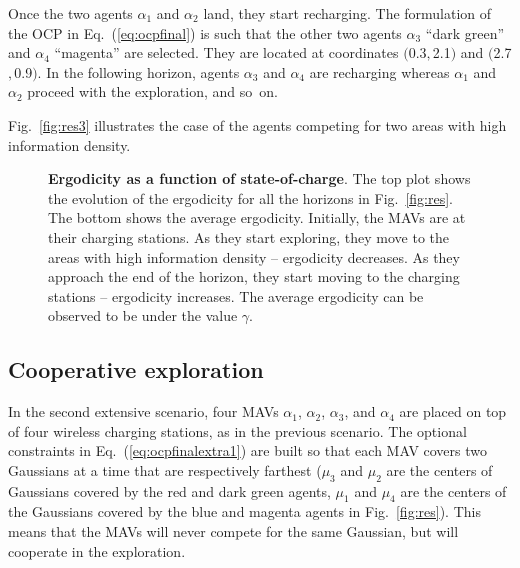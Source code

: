 \documentclass[letterpaper,10pt,conference,twoside]{IEEEtran}
\theoremstyle{definition}
\begin{document}
Once the two agents $\alpha_1$ and $\alpha_2$ land, they start recharging. The formulation of the OCP in Eq.~(\ref{eq:ocpfinal}) is such that the other two agents $\alpha_3$ ``dark green'' and $\alpha_4$ ``magenta'' are selected. They are located at coordinates $($0.3$,$2.1$)$ and $($2.7$,$0.9$)$. %
%
In the following horizon, agents $\alpha_3$ and $\alpha_4$ are recharging whereas $\alpha_1$ and $\alpha_2$ proceed with the exploration, %
and so~on.

Fig.~\ref{fig:res3} illustrates the case of the agents competing for two areas with high information density.

\begin{figure}[t!]
  \begin{minipage}[t!]{.5\columnwidth}
    \vspace*{-.2cm}
    
  \end{minipage}
  \begin{minipage}[c]{.48\columnwidth}
    \vspace*{.05cm}
    \caption{\textbf{Ergodicity %
    as a function of state-of-charge}. The top plot shows the evolution of the ergodicity for all the horizons in Fig.~\ref{fig:res}. The bottom shows the average ergodicity. Initially, the MAVs are at their charging stations. As they start exploring, they move to the areas with high information density -- ergodicity decreases. As they approach the end of the horizon, they start moving to the charging stations -- ergodicity increases. The average ergodicity can be observed to be under the value $\gamma$.}
    \label{fig:ergo}
  \end{minipage}
  \vspace*{-.4cm}
\end{figure}

\subsection*{Cooperative exploration}
\noindent
In the second extensive scenario, four MAVs $\alpha_1$, $\alpha_2$, $\alpha_3$, and $\alpha_4$ are placed on top of four wireless charging stations, as in the previous scenario. The optional constraints in Eq.~(\ref{eq:ocpfinalextra1}) are built so that each MAV covers two Gaussians at a time that are respectively farthest ($\mu_3$ and $\mu_2$ are the centers of Gaussians covered by the red and dark green agents, $\mu_1$ and $\mu_4$ are the centers of the Gaussians covered by the blue and magenta agents in Fig.~\ref{fig:res}). This means that the MAVs will never compete for the same Gaussian, but will cooperate in the exploration. %
\end{document}
